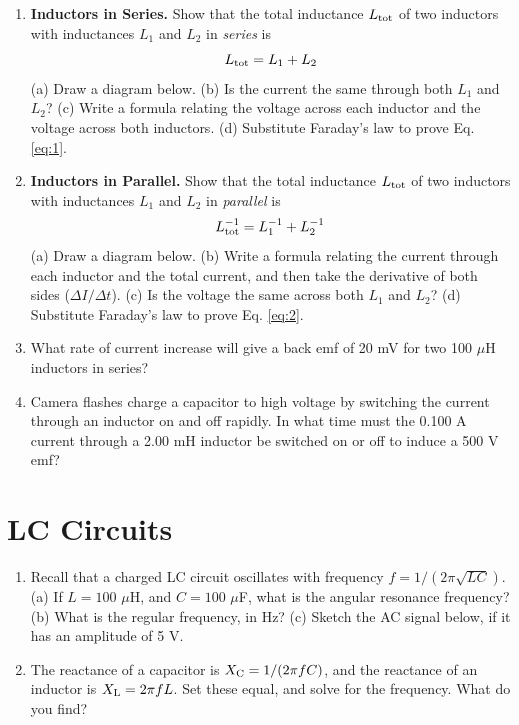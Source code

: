 \documentclass{article}
\begin{document}
\begin{enumerate}
\item \textbf{Inductors in Series.} Show that the total inductance $L_{\rm tot}$ of two inductors with inductances $L_1$ and $L_2$ in \textit{series} is
\begin{equation}
L_{\rm tot} = L_1 + L_2 \label{eq:1}
\end{equation} 
(a) Draw a diagram below. (b) Is the current the same through both $L_1$ and $L_2$? (c) Write a formula relating the voltage across each inductor and the voltage across both inductors. (d) Substitute Faraday's law to prove Eq. \ref{eq:1}.  \\ \vspace{2.5cm}
\item \textbf{Inductors in Parallel.} Show that the total inductance $L_{\rm tot}$ of two inductors with inductances $L_1$ and $L_2$ in \textit{parallel} is
\begin{equation}
L_{\rm tot}^{-1} = L_1^{-1} + L_2^{-1} \label{eq:2}
\end{equation} 
(a) Draw a diagram below. (b) Write a formula relating the current through each inductor and the total current, and then take the derivative of both sides ($\Delta I/\Delta t$).  (c) Is the voltage the same across both $L_1$ and $L_2$? (d) Substitute Faraday's law to prove Eq. \ref{eq:2}.  \\ \vspace{2.5cm}
\item What rate of current increase will give a back emf of 20 mV for two 100 $\mu$H inductors in series? \\ \vspace{2cm}
\item Camera flashes charge a capacitor to high voltage by switching the current through an inductor on and off rapidly. In what time must the 0.100 A current through a 2.00 mH inductor be switched on or off to induce a 500 V emf? \\ \vspace{1cm}
\end{enumerate}

\section{LC Circuits}

\begin{enumerate}
\item Recall that a charged LC circuit oscillates with frequency $f = 1/(2\pi\sqrt{LC})$. (a) If $L = 100$ $\mu$H, and $C = 100$ $\mu$F, what is the angular resonance frequency? (b) What is the regular frequency, in Hz? (c) Sketch the AC signal below, if it has an amplitude of 5 V. \\ \vspace{3cm}
\item The reactance of a capacitor is $X_{\rm C} = 1/(2\pi fC)$, and the reactance of an inductor is $X_{\rm L} = 2\pi fL$.  Set these equal, and solve for the frequency.  What do you find?
\end{enumerate}
\end{document}
